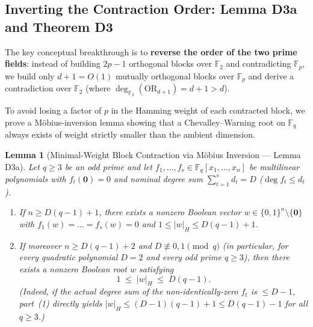 \documentclass[11pt,a4paper]{article}
\newtheorem{lemma}[theorem]{Lemma}
\theoremstyle{definition}
\newcommand{\F}{\mathbb{F}}
\newcommand{\OR}{\mathrm{OR}}
\begin{document}
\subsection{Inverting the Contraction Order: Lemma D3a and Theorem D3}

The key conceptual breakthrough is to \textbf{reverse the order of the two prime fields}: instead of building $2p-1$ orthogonal blocks over $\F_2$ and contradicting $\F_p$, we build only $d + 1 = O(1)$ mutually orthogonal blocks over $\F_p$ and derive a contradiction over $\F_2$ (where $\deg_{\F_2}(\OR_{d+1}) = d + 1 > d$).

To avoid losing a factor of $p$ in the Hamming weight of each contracted block, we prove a M{\"o}bius-inversion lemma showing that a Chevalley--Warning root on $\F_q$ always exists of weight strictly smaller than the ambient dimension.

\begin{lemma}[Minimal-Weight Block Contraction via M{\"o}bius Inversion --- Lemma D3a]
\label{lem:d3a}
Let $q \ge 3$ be an odd prime and let $f_1,\dots,f_s \in \F_q[x_1,\dots,x_n]$ be multilinear polynomials with $f_t(\mathbf{0}) = 0$ and nominal degree sum $\sum_{t=1}^s d_t = D$ ($\deg f_t \le d_t$).
\begin{enumerate}[leftmargin=*,nosep]
  \item If $n \ge D(q - 1) + 1$, there exists a nonzero Boolean vector $w \in \{0,1\}^n \setminus \{\mathbf{0}\}$ with $f_1(w) = \dots = f_s(w) = 0$ and $1 \le |w|_H \le D(q - 1) + 1$.
  \item If moreover $n \ge D(q - 1) + 2$ and $D \not\equiv 0, 1 \pmod q$ (in particular, for every quadratic polynomial $D = 2$ and every odd prime $q \ge 3$), then there exists a nonzero Boolean root $w$ satisfying
  \[
    1 \;\le\; |w|_H \;\le\; D(q - 1).
  \]
  (Indeed, if the actual degree sum of the non-identically-zero $f_t$ is $\le D - 1$, part~(1) directly yields $|w|_H \le (D - 1)(q - 1) + 1 \le D(q - 1) - 1$ for all $q \ge 3$.)
\end{enumerate}
\end{lemma}
\end{document}
